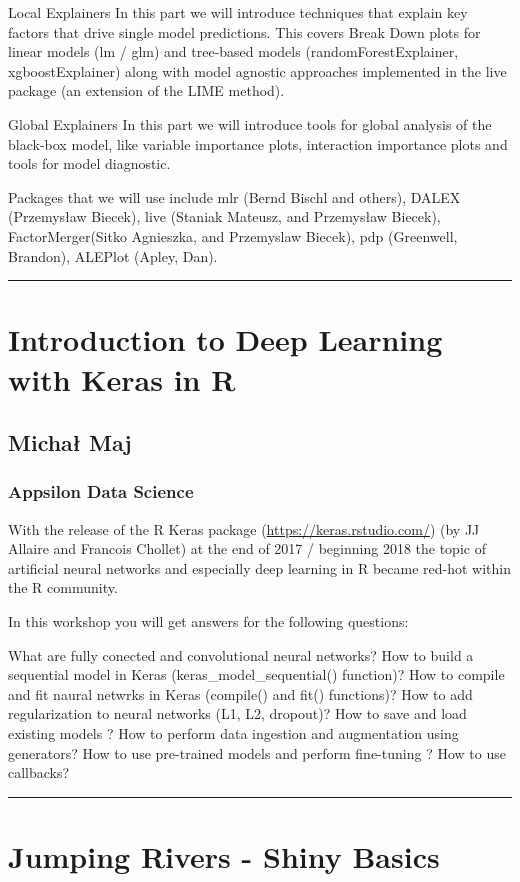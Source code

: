 \documentclass [12pt]{article}
\begin{document}
Local Explainers In this part we will introduce techniques that explain key factors that drive single model predictions. This covers Break Down plots for linear models (lm / glm) and tree-based models (randomForestExplainer, xgboostExplainer) along with model agnostic approaches implemented in the live package (an extension of the LIME method).

Global Explainers In this part we will introduce tools for global analysis of the black-box model, like variable importance plots, interaction importance plots and tools for model diagnostic.

Packages that we will use include mlr (Bernd Bischl and others), DALEX (Przemysław Biecek), live (Staniak Mateusz, and Przemysław Biecek), FactorMerger(Sitko Agnieszka, and Przemyslaw Biecek), pdp (Greenwell, Brandon), ALEPlot (Apley, Dan).

\noindent\rule{\textwidth}{1pt}
\section{Introduction to Deep Learning with Keras in R}
\subsection*{Michał Maj}
\subsubsection*{Appsilon Data Science}

With the release of the R Keras package (\url{https://keras.rstudio.com/}) (by JJ Allaire and Francois Chollet) at the end of 2017 / beginning 2018 the topic of artificial neural networks and especially deep learning in R became red-hot within the R community.

In this workshop you will get answers for the following questions:

What are fully conected and convolutional neural networks? 
How to build a sequential model in Keras (keras\_model\_sequential() function)? 
How to compile and fit naural netwrks in Keras (compile() and fit() functions)? 
How to add regularization to neural networks (L1, L2, dropout)? 
How to save and load existing models ? How to perform data ingestion and augmentation using generators? 
How to use pre-trained models and perform fine-tuning ? How to use callbacks?

\noindent\rule{\textwidth}{1pt}
\section{Jumping Rivers - Shiny Basics}
\end{document}

